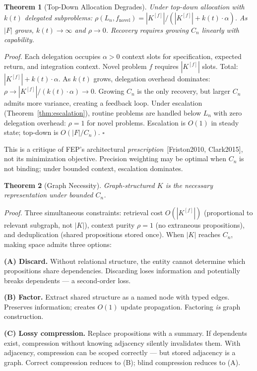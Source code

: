 \documentclass[11pt]{article}
\newtheorem{theorem}{Theorem}
\begin{document}
\begin{theorem}[Top-Down Allocation Degrades]\label{thm:topdown}
Under top-down allocation with $k(t)$ delegated subproblems:
$\rho(L_n, f_\text{novel}) = |K^{[f]}| / (|K^{[f]}| + k(t) \cdot \alpha)$.
As $|F|$ grows, $k(t) \to \infty$ and $\rho \to 0$. Recovery requires growing $C_n$ linearly with capability.
\end{theorem}

\emph{Proof.} Each delegation occupies $\alpha > 0$ context slots for specification, expected return, and integration context. Novel problem $f$ requires $|K^{[f]}|$ slots. Total: $|K^{[f]}| + k(t) \cdot \alpha$. As $k(t)$ grows, delegation overhead dominates: $\rho \to |K^{[f]}| / (k(t) \cdot \alpha) \to 0$. Growing $C_n$ is the only recovery, but larger $C_n$ admits more variance, creating a feedback loop. Under escalation (Theorem~\ref{thm:escalation}), routine problems are handled below $L_n$ with zero delegation overhead: $\rho = 1$ for novel problems. Escalation is $O(1)$ in steady state; top-down is $O(|F|/C_n)$. $\square$

This is a critique of FEP's architectural \emph{prescription}~[Friston2010, Clark2015], not its minimization objective. Precision weighting may be optimal when $C_n$ is not binding; under bounded context, escalation dominates.

\begin{theorem}[Graph Necessity]\label{thm:graph}
Graph-structured $K$ is the necessary representation under bounded $C_n$.
\end{theorem}

\emph{Proof.} Three simultaneous constraints: retrieval cost $O(|K^{[f]}|)$ (proportional to relevant subgraph, not $|K|$), context purity $\rho = 1$ (no extraneous propositions), and deduplication (shared propositions stored once). When $|K|$ reaches $C_n$, making space admits three options:

\textbf{(A) Discard.} Without relational structure, the entity cannot determine which propositions share dependencies. Discarding loses information and potentially breaks dependents --- a second-order loss.

\textbf{(B) Factor.} Extract shared structure as a named node with typed edges. Preserves information; creates $O(1)$ update propagation. Factoring \emph{is} graph construction.

\textbf{(C) Lossy compression.} Replace propositions with a summary. If dependents exist, compression without knowing adjacency silently invalidates them. With adjacency, compression can be scoped correctly --- but stored adjacency is a graph. Correct compression reduces to (B); blind compression reduces to (A).
\end{document}
